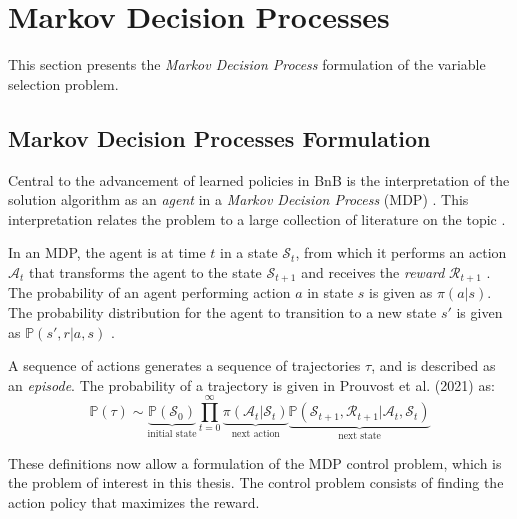 \section{Markov Decision Processes}\label{sec:back_mdp}

This section presents the \textit{Markov Decision Process} formulation of the variable selection problem. 


\subsection{Markov Decision Processes Formulation}\label{ssec:mdp}

Central to the advancement of learned policies in \gls{BnB} is the interpretation of the solution algorithm as an \textit{agent} in a \textit{Markov Decision Process} (\gls{MDP}) \cite{gasse2019exact}. This interpretation relates the problem to a large collection of literature on the topic \cite{howard1960dynamic}.

In an \gls{MDP}, the agent is at time $t$ in a state $\mathcal{S}_t$, from which it performs an action $\mathcal{A}_t$ that transforms the agent to the state $\mathcal{S}_{t+1}$ and receives the \textit{reward} $\mathcal{R}_{t+1}$ \cite{prouvost2021ecole}. The probability of an agent performing action $a$ in state $s$ is given as $\pi (a | s)$. The probability distribution for the agent to transition to a new state $s'$ is given as $\mathbb{P}(s', r | a, s)$ \cite{prouvost2021ecole}. 

 
A sequence of actions generates a sequence of trajectories $\tau$, and is described as an \textit{episode}. The probability of a trajectory is given in Prouvost et al. (2021) \cite{prouvost2020ecole} as:
\begin{equation}
    \mathbb{P}(\tau) \sim \underbrace{\mathbb{P}(\mathcal{S}_0)}_{\text{initial state}}
\prod_{t=0}^\infty \underbrace{\pi(\mathcal{A}_t | \mathcal{S}_t)}_{\text{next action}}
\underbrace{\mathbb{P}(\mathcal{S}_{t+1}, \mathcal{R}_{t+1} | \mathcal{A}_t, \mathcal{S}_t)}_{\text{next state}}
\end{equation}

These definitions now allow a formulation of the \gls{MDP} control problem, which is the problem of interest in this thesis. The control problem consists of finding the action policy that maximizes the reward. %




